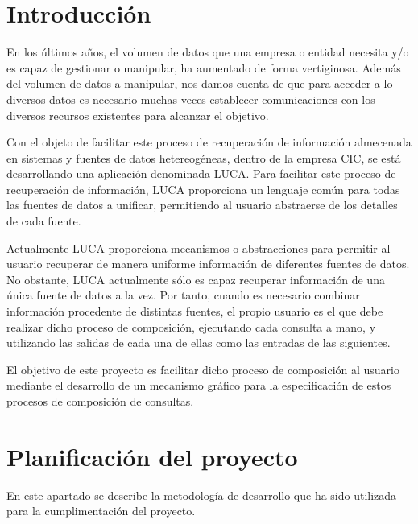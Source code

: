 \documentclass[a4paper,12pt]{book}
\begin{document}
		\section{Introducción}
	
	
			En los últimos años, el volumen de datos que una empresa o entidad necesita y/o es capaz de gestionar o manipular, ha aumentado de forma vertiginosa. Además del volumen de datos a manipular, nos damos cuenta de que para acceder a lo diversos datos es necesario muchas veces establecer comunicaciones con los diversos recursos existentes para alcanzar el objetivo.
			
			\vspace{5mm}
			
			
			 Con el objeto de facilitar este proceso de recuperación de información almecenada en sistemas y fuentes de datos hetereogéneas, dentro de la empresa	CIC, se está desarrollando una aplicación denominada LUCA. Para	facilitar este proceso de recuperación de información, LUCA proporciona un lenguaje común para todas las fuentes de datos a unificar, permitiendo al
			usuario abstraerse de los detalles de cada fuente.
			
			\vspace{5mm}
			
			 Actualmente LUCA proporciona mecanismos o abstracciones para permitir al	usuario recuperar de manera uniforme información de diferentes fuentes de datos. No obstante, LUCA actualmente sólo es capaz recuperar información de una única fuente de datos a la vez. Por tanto, cuando es necesario combinar información procedente de distintas fuentes, el propio usuario es el que debe realizar dicho	proceso de composición, ejecutando cada consulta a mano, y utilizando las salidas de cada una de ellas como las entradas de las siguientes.
			 
			 \vspace{5mm}
			 
			 El objetivo de este proyecto es facilitar dicho proceso de composición al usuario mediante el desarrollo de un mecanismo gráfico para la especificación de estos procesos de composición de consultas.
			 
	 
	 	\section{Planificación del proyecto}
	 	
	 	En este apartado se describe la metodología de desarrollo que ha sido utilizada para la cumplimentación del proyecto. 
	 	
\end{document}
